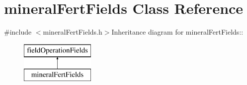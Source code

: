 \hypertarget{classmineral_fert_fields}{
\section{mineralFertFields Class Reference}
\label{classmineral_fert_fields}
}


{\ttfamily \#include $<$mineralFertFields.h$>$}Inheritance diagram for mineralFertFields::\begin{figure}[H]
\begin{center}
\leavevmode
\includegraphics[height=2cm]{classmineral_fert_fields}
\end{center}
\end{figure}
